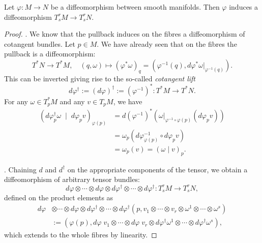 \begin{proposition}
  Let $\varphi:M\to N$ be a diffeomorphism between smooth manifolds.
  Then $\varphi$ induces a diffeomorphism $T_s^rM \to T_s^r N$.
\end{proposition}
\begin{proof}
.
We know that the pullback induces on the fibres a diffeomorphism of cotangent bundles. Let $p\in M$.
We have already seen that on the fibres the pullback is a diffeomorphism:
\begin{equation}
  T^*N \to T^* M, \quad
  (q,\omega) \mapsto (\varphi^*\omega)_q = \left(\varphi^{-1}(q), d\varphi^*\omega|_{\varphi^{-1}(q)}\right).
\end{equation}
This can be inverted giving rise to the so-called \emph{cotangent lift}
\begin{equation}
  d\varphi^\dagger :=(d\varphi)^\dagger := (\varphi^{-1})^*: T^*M \to T^*N.
\end{equation}
For any $\omega\in T_p^* M$ and any $v\in T_pM$, we have
\begin{align}
  (d\varphi^\dagger_p \omega \;\mid\; d\varphi_p v)_{\varphi(p)} &=  d(\varphi^{-1})^*(\omega|_{\varphi^{-1}\circ\varphi(p)} (d\varphi_p v) )\\
  &= \omega_p(d\varphi^{-1}_{\varphi(p)} \circ d\varphi_p v ) \\
  &= \omega_p(v) = (\omega \mid v)_p.
\end{align}

.
Chaining $d$ and $d^\dagger$ on the appropriate components of the tensor, we obtain a diffeomorphism of arbitrary tensor bundles:
\begin{equation}
  d\varphi \otimes\cdots\otimes d\varphi \otimes d\varphi^\dagger \otimes\cdots\otimes d\varphi^\dagger  : T_s^rM \to T_s^r N,
\end{equation}
defined on the product elements as
\begin{align}
  d\varphi &\otimes\cdots\otimes d\varphi \otimes d\varphi^\dagger \otimes\cdots\otimes d\varphi^\dagger  (p, v_1 \otimes \cdots\otimes v_r \otimes \omega^1\otimes\cdots\otimes\omega^s) \\
  &:= (\varphi(p), d\varphi\; v_1 \otimes \cdots\otimes d\varphi\; v_r \otimes d\varphi^\dagger \omega^1\otimes\cdots\otimes d\varphi^\dagger \omega^s),
\end{align}
which extends to the whole fibres by linearity.
\end{proof}


